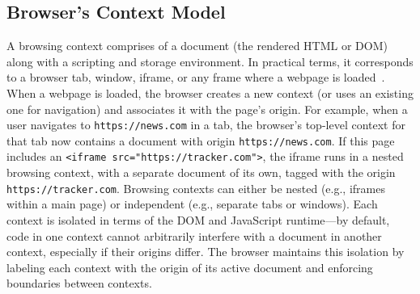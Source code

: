 \subsection{Browser’s Context Model}
%
A browsing context comprises of a document (the rendered HTML or DOM) along with a scripting and storage environment.
%
In practical terms, it corresponds to a browser tab, window, iframe, or any frame where a webpage is loaded~\cite{MDNBrowsingContext}.
%
When a webpage is loaded, the browser creates a new context (or uses an existing one for navigation) and associates it with the page’s origin.
%
For example, when a user navigates to \texttt{https://news.com} in a tab, the browser’s top-level context for that tab now contains a document with origin \texttt{https://news.com}.
%
If this page includes an \texttt{<iframe src="https://tracker.com">}, the iframe runs in a nested browsing context, with a separate document of its own, tagged with the origin \texttt{https://tracker.com}.
%
Browsing contexts can either be nested (e.g., iframes within a main page) or independent (e.g., separate tabs or windows).
%
Each context is isolated in terms of the DOM and JavaScript runtime---by default, code in one context cannot arbitrarily interfere with a document in another context, especially if their origins differ.
%
The browser maintains this isolation by labeling each context with the origin of its active document and enforcing boundaries between contexts.




